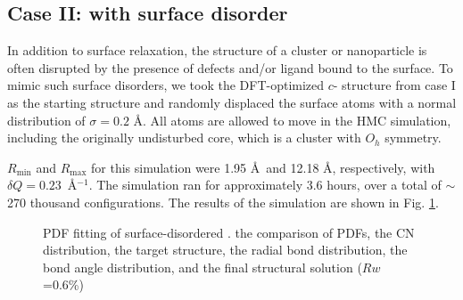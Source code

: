 \subsection{Case II:  with surface disorder}
In addition to surface relaxation, the  structure of a cluster or nanoparticle is often disrupted by the presence of defects and/or ligand bound to the surface.  To mimic such surface disorders, we took the DFT-optimized $c$- structure from case I as the starting structure and randomly displaced the surface atoms with a normal distribution of $\sigma = 0.2$ \AA. All atoms are allowed to move in the HMC simulation, including the originally undisturbed core, which is a  cluster with $O_h$ symmetry.

 $R_\mathrm{min}$ and $R_\mathrm{max}$ for this simulation were 1.95 \AA ~and 12.18 \AA, respectively, with $\delta Q=0.23$~\AA$^{-1}$.
The simulation ran for approximately 3.6 hours, over a total of $\sim$270 thousand configurations.
The results of the simulation are shown in Fig. \ref{fig: Au55 surface}.
\begin{figure}
  \def \localimgpath {./Au_55_DFT_distorted_HMC_paper_final/55d7d4c7d2d355710ddb3fe2}
  \centering
  \captionsetup[subfigure]{labelformat=simple}
    \quad
    \quad
    \quad
    \quad
    \quad
    \quad

  \caption[ PDF fitting of surface-disordered .]{ PDF fitting of surface-disordered .
  \protect{} the comparison of PDFs,
  \protect{} the CN distribution,
  \protect{} the target structure,
  \protect{} the radial bond distribution,
  \protect{} the bond angle distribution,
  and \protect{} the final structural solution ($Rw$=0.6\%)
  }
	\label{fig: Au55 surface}
\end{figure}

